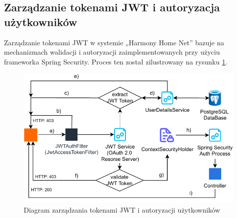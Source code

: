 \subsection{Zarządzanie tokenami JWT i autoryzacja użytkowników}

Zarządzanie tokenami JWT w systemie „Harmony Home Net” bazuje na mechanizmach walidacji i autoryzacji zaimplementowanych przy użyciu frameworka Spring Security. Proces ten został zilustrowany na rysunku \ref{fig:resource_access_flow}.

\begin{figure}[ht]
    \centering
    \includegraphics[scale=1]{rys03/Diagram_dotępu_do_zasobów_systemu} 
    \caption{Diagram zarządzania tokenami JWT i autoryzacji użytkowników~\cite{JWToauth}}
    \label{fig:resource_access_flow}
\end{figure}

